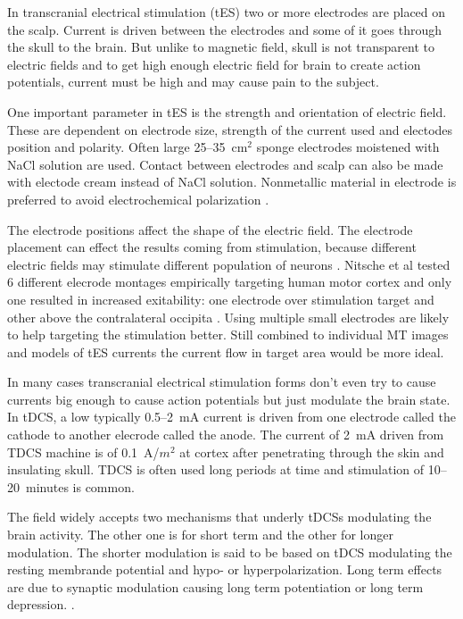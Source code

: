 \documentclass[english,12pt,a4paper,dvips]{article}
\begin{document}
In transcranial electrical stimulation (tES) two or more electrodes are placed on the scalp. Current is driven between the electrodes and some of it goes through the skull to the brain. But unlike to magnetic field, skull is not transparent to electric fields and to get high enough electric field for brain to create action potentials, current must be high and may cause pain to the subject. 

One important parameter in tES is the strength and orientation of electric field. These are dependent on electrode size, strength of the current used and electodes position and polarity. Often large 25--35~cm$^2$ sponge electrodes moistened with NaCl solution are used. Contact between electrodes and scalp can also be made with electode cream instead of NaCl solution. Nonmetallic material in electrode is preferred to avoid electrochemical polarization \cite{nitsche08}. 

The electrode positions affect the shape of the electric field. The electrode placement can effect the results coming from stimulation, because different electric fields may stimulate different population of neurons \cite{nitsche08}.  Nitsche et al tested 6 different elecrode montages empirically targeting human motor cortex and only one resulted in increased exitability: one electrode over stimulation target and other above the contralateral occipita \cite{nitsche00}.
Using multiple small electrodes are likely to help targeting the stimulation better. Still combined to individual MT images and models of tES currents the current flow in target area would be more ideal\cite{herrmann13}.

In many cases transcranial electrical stimulation forms don't even try to cause currents big enough to cause action potentials but just modulate the brain state. In tDCS, a low typically 0.5--2~mA current is driven from one electrode called the cathode to another elecrode called the anode. The current of 2~mA driven from TDCS machine is of 0.1~A/$m^2$ at cortex \cite{miranda06} after penetrating through the skin and insulating skull. TDCS is often used long periods at time and stimulation of 10--20~minutes is common.

The field widely accepts two mechanisms that underly tDCSs modulating the brain activity. The other one is for short term and the other for longer modulation. The shorter modulation is said to be based on tDCS modulating the resting membrande potential and hypo- or hyperpolarization. Long term effects are due to synaptic modulation causing long term potentiation or long term depression. \cite{stagg11}. 
\end{document}
